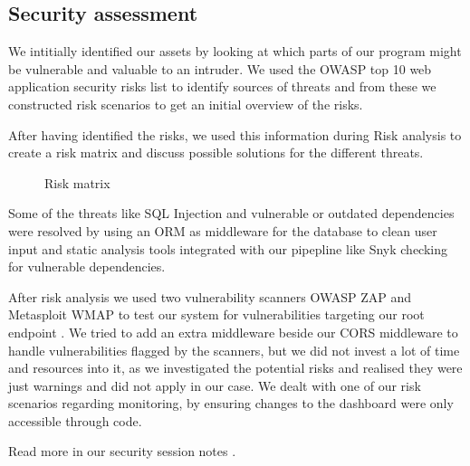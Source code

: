 \subsection{Security assessment}
We intitially identified our assets by looking at which parts of our program might be vulnerable and valuable to an intruder. 
We used the OWASP top 10 web application security risks list \cite{owasp-top-10} to identify sources of threats and from these we constructed risk scenarios to get an initial overview of the risks.

After having identified the risks, we used this information during Risk analysis to create a risk matrix and discuss possible solutions for the different threats. 


\begin{wrapfigure}{R}{0.38\paperwidth}
    \hspace*{0.35in}
    \caption{Risk matrix}
    \label{fig:Risk-matrix}
\end{wrapfigure}

Some of the threats like SQL Injection and vulnerable or outdated dependencies were resolved by using an ORM \cite{gorm} as middleware for the database to clean user input and static analysis tools integrated with our pipepline like Snyk \cite{snyk} checking for vulnerable dependencies.

After risk analysis we used two vulnerability scanners OWASP ZAP \cite{tool:owasp-zap} and Metasploit \cite{metasploit} WMAP \cite{metasploit-wmap} to test our system for vulnerabilities targeting our root endpoint \cite{minitwit-root-endpoint}.
We tried to add an extra middleware beside our CORS middleware to handle vulnerabilities flagged by the scanners, but we did not invest a lot of time and resources into it, as we investigated the potential risks and realised they were just warnings and did not apply in our case.
We dealt with one of our risk scenarios regarding monitoring, by ensuring changes to the dashboard were only accessible through code.

Read more in our security session notes \cite{repo:security-session-notes}.
